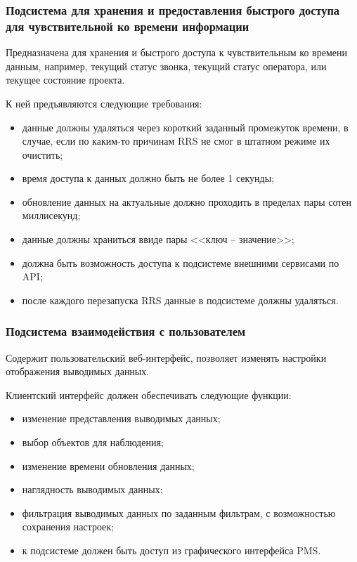 \subsubsection{Подсистема для хранения и предоставления быстрого доступа для чувствительной ко времени информации}

Предназначена для хранения и быстрого доступа к чувствительным ко времени данным,
например, текущий статус звонка, текущий статус оператора, или текущее состояние проекта.

К ней предъявляются следующие требования:
\begin{itemize}
    \item данные должны удаляться через короткий заданный промежуток времени, в случае,
    если по каким-то причинам RRS не смог в штатном режиме их очистить;
    \item время доступа к данных должно быть не более 1 секунды;
    \item обновление данных на актуальные должно проходить в пределах пары сотен миллисекунд;
    \item данные должны храниться ввиде пары <<ключ -- значение>>;
    \item должна быть возможность доступа к подсистеме внешними сервисами по API;
    \item после каждого перезапуска RRS данные в подсистеме должны удаляться.
\end{itemize}

\subsubsection{Подсистема взаимодействия с пользователем}

Содержит пользовательский веб-интерфейс, позволяет изменять настройки отображения выводимых данных.

Клиентский интерфейс должен обеспечивать следующие функции:
\begin{itemize}
    \item изменение представления выводимых данных;
    \item выбор объектов для наблюдения;
    \item изменение времени обновления данных;
    \item наглядность выводимых данных;
    \item фильтрация выводимых данных по заданным фильтрам, с возможностью сохранения настроек;
    \item к подсистеме должен быть доступ из графического интерфейса PMS\@.
\end{itemize}

